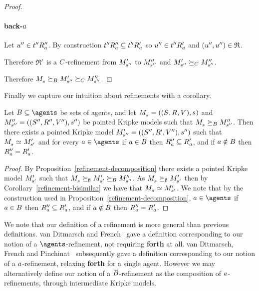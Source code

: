 \begin{proof}
\paragraph{back-$a$}
Let ${u}^{\prime\prime} \in {{t}^{\prime\prime}} {R^{\prime\prime}_{a}}$.
By construction ${{t}^{\prime\prime}} {R^{\prime\prime}_{a}} \subseteq {{t}^{\prime\prime}} {R^{\prime}_{a}}$ so ${u}^{\prime\prime} \in {{t}^{\prime\prime}} {R^{\prime}_{a}}$ and $({u}^{\prime\prime}, {u}^{\prime\prime}) \in \mathfrak{R}$.

Therefore $\mathfrak{R}'$ is a $C$-refinement from ${M^{\prime}_{{s}^{\prime\prime}}}$ to ${M^{\prime\prime}_{{s}^{\prime\prime}}}$ and ${M^{\prime}_{{s}^{\prime\prime}}} \succeq_{C} {M^{\prime\prime}_{{s}^{\prime\prime}}}$.

Therefore $\kPModel{\kStateS} \simulatesBs \kPModelP{\kStateSPP} \simulatesCs \kPModelPP{\kStateSPP}$.
\end{proof}

Finally we capture our intuition about refinements with a corollary.

\begin{corollary}
Let $\agentsB \subseteq \agents$ be sets of agents, and let $\kPModelAndTuple{\kStateS}$ and $\kPModelAndTuplePP{\kStateSPP}$ be pointed Kripke models such that $\kPModel{\kStateS} \simulatesBs \kPModelPP{\kStateSPP}$.
Then there exists a pointed Kripke model ${M^{\prime}_{{s}^{\prime\prime}}} = (({S^{\prime\prime}}, {R^{\prime}_{}}, {V^{\prime\prime}}), {s}^{\prime\prime})$ such that $\kPModel{\kStateS} \bisimilar \kPModelP{\kStateSP}$ and for every $\agentA \in \agents$ if $a \in B$ then ${R^{\prime\prime}_{a}} \subseteq {R^{\prime}_{a}}$, and if $a \notin B$ then ${R^{\prime\prime}_{a}} = {R^{\prime}_{a}}$.
\end{corollary}

\begin{proof}
By Proposition~\ref{refinement-decomposition} there exists a pointed Kripke model ${M^{\prime}_{{s}^{\prime}}}$ such that $\kPModel{\kStateS} \simulates[\emptyset] \kPModelP{\kStateSP} \simulatesBs \kPModelPP{\kStateSPP}$.
As $\kPModel{\kStateS} \simulates[\emptyset] \kPModelP{\kStateSP}$ then by Corollary~\ref{refinement-bisimilar} we have that $\kPModel{\kStateS} \bisimilar \kPModelP{\kStateSP}$.
We note that by the construction used in Proposition~\ref{refinement-decomposition}, $\agentA \in \agents$ if $a \in B$ then ${R^{\prime\prime}_{a}} \subseteq {R^{\prime}_{a}}$, and if $a \notin B$ then ${R^{\prime\prime}_{a}} = {R^{\prime}_{a}}$.
\end{proof}

We note that our definition of a refinement is more general than previous definitions.
van Ditmarsch and French~\cite{vanditmarsch:2009} gave a definition corresponding to our notion of a $\agents$-refinement, not requiring {\bf forth} at all.
van Ditmarsch, French and Pinchinat~\cite{vanditmarsch:2010} subsequently gave a definition corresponding to our notion of a $a$-refinement, relaxing {\bf forth} for a single agent.
However we may alternatively define our notion of a $B$-refinement as the composition of $a$-refinements, through intermediate Kripke models.

